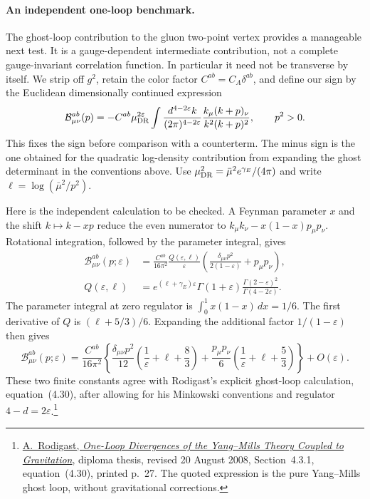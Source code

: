 \documentclass[11pt]{article}
\begin{document}
\paragraph{An independent one-loop benchmark.}
The ghost-loop contribution to the gluon two-point vertex provides a
manageable next test. It is a gauge-dependent intermediate contribution,
not a complete gauge-invariant correlation function. In particular it
need not be transverse by itself. We strip off $g^2$, retain the color
factor $C^{ab}=C_A\delta^{ab}$, and define our sign by the Euclidean
dimensionally continued expression
\begin{equation}\label{eq:ghost-loop-integral}
 \mathcal B_{\mu\nu}^{ab}(p)
 =-C^{ab}\mu_{\rm DR}^{2\varepsilon}
   \int\frac{d^{4-2\varepsilon}k}{(2\pi)^{4-2\varepsilon}}
       \frac{k_\mu(k+p)_\nu}{k^2(k+p)^2},\qquad p^2>0.
\end{equation}
This fixes the sign before comparison with a counterterm. The minus
sign is the one obtained for the quadratic log-density contribution
from expanding the ghost determinant in the conventions above.
Use $\mu_{\rm DR}^2=\bar\mu^2 e^{\gamma_E}/(4\pi)$ and write
$\ell=\log(\bar\mu^2/p^2)$.

Here is the independent calculation to be checked. A Feynman parameter
$x$ and the shift $k\mapsto k-xp$ reduce the even numerator to
$k_\mu k_\nu-x(1-x)p_\mu p_\nu$. Rotational integration, followed by
the parameter integral, gives
\begin{align}
 \mathcal B_{\mu\nu}^{ab}(p;\varepsilon)
 &=\frac{C^{ab}}{16\pi^2}\frac{Q(\varepsilon,\ell)}{\varepsilon}
   \left(\frac{\delta_{\mu\nu}p^2}{2(1-\varepsilon)}
                         +p_\mu p_\nu\right),
 \label{eq:ghost-loop-gamma}\\
 Q(\varepsilon,\ell)
 &=e^{(\ell+\gamma_E)\varepsilon}\Gamma(1+\varepsilon)
       \frac{\Gamma(2-\varepsilon)^2}{\Gamma(4-2\varepsilon)}.
 \nonumber
\end{align}
The parameter integral at zero regulator is
$\int_0^1x(1-x)\,dx=1/6$. The first derivative of $Q$ is
$(\ell+5/3)/6$. Expanding the additional factor $1/(1-\varepsilon)$
then gives
\begin{equation}\label{eq:ghost-loop-benchmark}
 \mathcal B_{\mu\nu}^{ab}(p;\varepsilon)
 =\frac{C^{ab}}{16\pi^2}
 \left\{\frac{\delta_{\mu\nu}p^2}{12}
       \left(\frac1\varepsilon+\ell+\frac83\right)
    +\frac{p_\mu p_\nu}{6}
       \left(\frac1\varepsilon+\ell+\frac53\right)\right\}
       +O(\varepsilon).
\end{equation}
These two finite constants agree with Rodigast's explicit ghost-loop
calculation, equation~(4.30), after allowing for his Minkowski
conventions and regulator $4-d=2\varepsilon$.\footnote{
\href{https://qft.physik.hu-berlin.de/wp-content/uploads/2012/10/DA-andreas.pdf}{
A.~Rodigast, \emph{One-Loop Divergences of the Yang--Mills Theory Coupled
to Gravitation}}, diploma thesis, revised 20 August 2008,
Section~4.3.1, equation~(4.30), printed p.~27. The quoted expression is
the pure Yang--Mills ghost loop, without gravitational corrections.}
\end{document}
